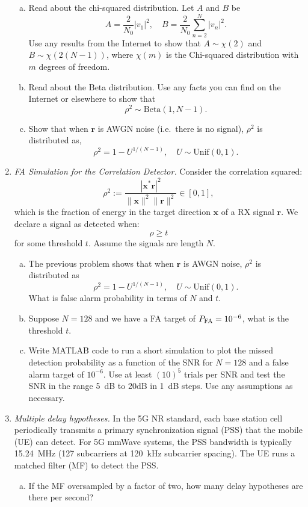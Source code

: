 \documentclass[11pt]{article}
\newcommand{\rbf}{\boldsymbol{r}}
\newcommand{\xbf}{\boldsymbol{x}}
\begin{document}
\begin{enumerate}
\begin{enumerate}[(a)]
\item Read about the chi-squared distribution.  Let $A$ and $B$ be
\[
    A = \frac{2}{N_0}|v_1|^2, \quad B =  \frac{2}{N_0}\sum_{n=2}^N |v_n|^2.
\]
Use any results from the Internet to show that $A \sim \chi(2)$ and $B \sim \chi(2(N-1))$,
where $\chi(m)$ is the Chi-squared distribution with $m$ degrees of freedom.

\item   Read about the Beta distribution.  Use any facts you can find
on the Internet or elsewhere to show that
\[
    \rho^2 \sim \mathrm{Beta}(1,N-1).
\]


\item Show that when
$\rbf$ is AWGN noise (i.e.\ there is no signal), $\rho^2$ is
distributed as,
\[
    \rho^2 = 1-U^{1/(N-1)},  \quad U \sim \mathrm{Unif}(0,1).
\]

\end{enumerate}



\item \label{prob:pfa_corr} \emph{FA Simulation 
for the Correlation Detector.}  Consider the correlation
squared:
\[
    \rho^2 := \frac{|\xbf^*\rbf|^2}{\|\xbf\|^2\|\rbf\|^2} \in [0,1],
\]
which is the fraction of energy in the target direction $\xbf$
of a RX signal $\rbf$.  We declare a signal as detected when:
\[
    \rho \geq t
\]
for some threshold $t$.  Assume the signals are length $N$.
\begin{enumerate}[(a)]
\item   The previous problem shows that when $\rbf$ is AWGN noise,
$\rho^2$ is distributed as
\[
    \rho^2 = 1-U^{1/(N-1)},  \quad U \sim \mathrm{Unif}(0,1).
\]
What is false alarm probability in terms of $N$ and $t$.


\item Suppose $N=128$ and we have a FA target of $P_{\rm FA}=10^{-6}$,
what is the threshold $t$.

\item Write MATLAB code to run a short simulation to plot the
missed detection probability as a function of the SNR for $N=128$
and a false alarm target of $10^{-6}$.  Use at least $(10)^5$ trials per SNR
and test the SNR in the range \SI{5}{dB} to {20}{dB} in \SI{1}{dB} steps.
Use any assumptions as necessary.
\end{enumerate}





\item \emph{Multiple delay hypotheses.}
In the 5G NR standard, each base station cell periodically transmits a
primary synchronization signal (PSS) that the mobile (UE) can detect.
For 5G mmWave systems, the PSS bandwidth is typically
15.24~MHz (127 subcarriers at 120~kHz subcarrier spacing).
The UE runs a matched filter (MF) to detect the PSS.
\begin{enumerate}[(a)]
\item If the MF oversampled by a factor of two, how many delay hypotheses
are there per second?


\end{enumerate}
\end{enumerate}
\end{document}
